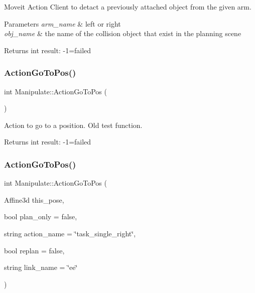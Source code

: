 Moveit Action Client to detact a previously attached object from the given arm. 


\begin{DoxyParams}{Parameters}
{\em arm\+\_\+name} & left or right \\
\hline
{\em obj\+\_\+name} & the name of the collision object that exist in the planning scene \\
\hline
\end{DoxyParams}
\begin{DoxyReturn}{Returns}
int result\+: -\/1=failed 
\end{DoxyReturn}
\mbox{\label{structManipulate_a71a541174e9e4c83d1c7786a12ed19c4}} 
\subsubsection{\texorpdfstring{Action\+Go\+To\+Pos()}{ActionGoToPos()}\hspace{0.1cm}{\footnotesize\ttfamily [1/5]}}
{\footnotesize\ttfamily int Manipulate\+::\+Action\+Go\+To\+Pos (\begin{DoxyParamCaption}{ }\end{DoxyParamCaption})\hspace{0.3cm}{\ttfamily [private]}}



Action to go to a position. Old test function. 

\begin{DoxyReturn}{Returns}
int result\+: -\/1=failed 
\end{DoxyReturn}
\mbox{\label{structManipulate_a27ddd517fdecd8eadd65d0b34efca2d1}} 
\subsubsection{\texorpdfstring{Action\+Go\+To\+Pos()}{ActionGoToPos()}\hspace{0.1cm}{\footnotesize\ttfamily [2/5]}}
{\footnotesize\ttfamily int Manipulate\+::\+Action\+Go\+To\+Pos (\begin{DoxyParamCaption}\item[{Affine3d}]{this\+\_\+pose,  }\item[{bool}]{plan\+\_\+only = {\ttfamily false},  }\item[{string}]{action\+\_\+name = {\ttfamily \char`\"{}task\+\_\+single\+\_\+right\char`\"{}},  }\item[{bool}]{replan = {\ttfamily false},  }\item[{string}]{link\+\_\+name = {\ttfamily \char`\"{}ee\char`\"{}} }\end{DoxyParamCaption})\hspace{0.3cm}{\ttfamily [private]}}



